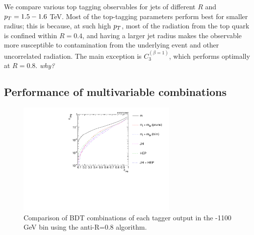  We compare various top tagging observables for jets of different $R$ and $p_T=1.5-1.6$ TeV. Most of the top-tagging parameters perform best for smaller radius; this is because, at such high $p_T$, most of the radiation from the top quark is confined within $R=0.4$, and having a larger jet radius makes the observable more susceptible to contamination from the underlying event and other uncorrelated radiation. The main exception is $C_3^{(\beta=1)}$, which performs optimally at $R=0.8$. \emph{why?}








\subsection{Performance of multivariable combinations}


\begin{figure}
\begin{center}
\includegraphics[width=0.7\textwidth]{./Figures/TTagging/multi_variable/pT.1TeV.R.0.8/Rocs_tagger_groom.pdf}
\caption{Comparison of BDT combinations of each tagger output in the -1100 GeV bin using the anti-\kT R=0.8 algorithm.}
\label{fig:pt1000_taggers_AKt_R08}
\end{center}
\end{figure}


